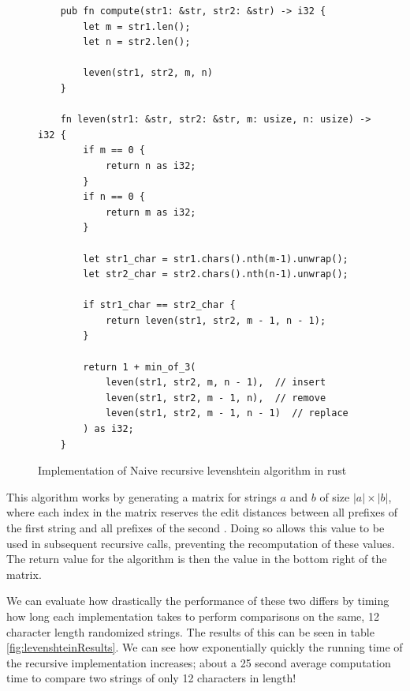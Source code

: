 \documentclass[a4paper,11pt]{article}
\begin{document}
\begin{figure}
    \begin{verbatim}
    pub fn compute(str1: &str, str2: &str) -> i32 {
        let m = str1.len();
        let n = str2.len();
    
        leven(str1, str2, m, n)
    }

    fn leven(str1: &str, str2: &str, m: usize, n: usize) -> i32 {
        if m == 0 {
            return n as i32;
        }
        if n == 0 {
            return m as i32;
        }
    
        let str1_char = str1.chars().nth(m-1).unwrap();
        let str2_char = str2.chars().nth(n-1).unwrap();
        
        if str1_char == str2_char {
            return leven(str1, str2, m - 1, n - 1);
        }
    
        return 1 + min_of_3(
            leven(str1, str2, m, n - 1),  // insert
            leven(str1, str2, m - 1, n),  // remove
            leven(str1, str2, m - 1, n - 1)  // replace
        ) as i32;
    }
    \end{verbatim}
    \caption{Implementation of Naive recursive levenshtein algorithm in rust}
    \label{fig:levenshteinRustImplementation}
\end{figure}

This algorithm works by generating a matrix for strings $a$ and $b$ of size $|a| \times |b|$, where each index in the matrix reserves the edit distances between all prefixes of the first string and all prefixes of the second \citep{wagnerFischer}. Doing so allows this value to be used in subsequent recursive calls, preventing the recomputation of these values. The return value for the algorithm is then the value in the bottom right of the matrix.

We can evaluate how drastically the performance of these two differs by timing how long each implementation takes to perform comparisons on the same, 12 character length randomized strings. The results of this can be seen in table \ref{fig:levenshteinResults}. We can see how exponentially quickly the running time of the recursive implementation increases; about a 25 second average computation time to compare two strings of only 12 characters in length! 
\end{document}
